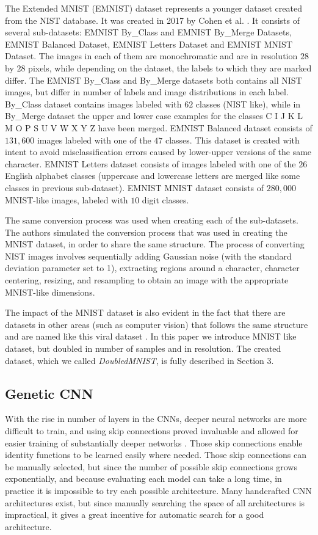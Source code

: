 \documentclass[eng]{simposium}
\begin{document}
The Extended MNIST (EMNIST) dataset represents a younger dataset created from the NIST database.  
It was created in 2017 by Cohen et al. \cite{1}.  
It consists of several sub-datasets: EMNIST By\_Class and EMNIST By\_Merge Datasets, EMNIST Balanced Dataset,  
EMNIST Letters Dataset and EMNIST MNIST Dataset.  
The images in each of them are monochromatic and are in resolution $28$ by $28$ pixels,  
while depending on the dataset, the labels to which they are marked differ.  
The EMNIST By\_Class and By\_Merge datasets both contains all NIST images, but differ in number of labels and image distributions  
in each label. By\_Class dataset contains images labeled with $62$ classes (NIST like), while in By\_Merge dataset  
the upper and lower case examples for the classes C I J K L M O P S U V W X Y Z have been merged.  
EMNIST Balanced dataset consists of $131,600$ images labeled with one of the $47$ classes.  
This dataset is created with intent to avoid misclassification errors caused by lower-upper versions of the same character.  
EMNIST Letters dataset consists of images labeled with one of the $26$ English alphabet classes  
(uppercase and lowercase letters are merged like some classes in previous sub-dataset).  
EMNIST MNIST dataset consists of $280,000$ MNIST-like images, labeled with $10$ digit classes.  
  
The same conversion process was used when creating each of the sub-datasets.  
The authors simulated the conversion process that was used in creating the MNIST dataset, in order  
to share the same structure.  
The process of converting NIST images involves sequentially adding Gaussian noise (with the standard deviation parameter set to 1),  
extracting regions around a character, character centering, resizing, and resampling to obtain an image with the appropriate MNIST-like dimensions.  

The impact of the MNIST dataset is also evident in the fact that there are datasets in other areas (such as computer vision) that 
follows the same structure and are named like this viral dataset \cite{27}.  
In this paper we introduce MNIST like dataset, but doubled in number of samples and in resolution.  
The created dataset, which we called \textit{DoubledMNIST}, is fully described in Section 3.  

\subsection{Genetic CNN} 

With the rise in number of layers in the CNNs, deeper neural networks are more difficult to train, and using skip connections proved invaluable and allowed  
for easier training of substantially deeper networks \cite{6}. Those skip connections enable identity functions to be learned easily where needed. 
Those skip connections can be manually selected, but since the number of possible skip connections grows exponentially, and because evaluating each model can take a long time,  
in practice it is impossible to try each possible architecture. 
Many handcrafted CNN architectures exist, but since manually searching the space of all architectures is impractical, it gives a great incentive for automatic search  
for a good architecture. 
\end{document}
